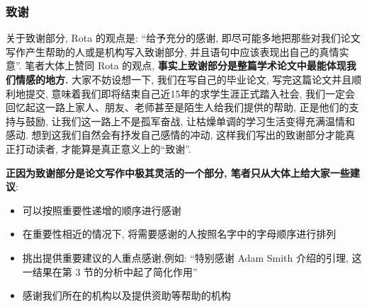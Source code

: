 \documentclass{formatBook}
\begin{document}
\subsubsection{致谢}
关于致谢部分, Rota 的观点是: ``给予充分的感谢, 即尽可能多地把那些对我们论文写作产生帮助的人或是机构写入致谢部分, 并且语句中应该表现出自己的真情实意''\cite{RotaTen1997}. 笔者大体上赞同 Rota 的观点, \textbf{事实上致谢部分是整篇学术论文中最能体现我们情感的地方. }大家不妨设想一下, 我们在写自己的毕业论文, 写完这篇论文并且顺利地提交, 意味着我们即将结束自己近15年的求学生涯正式踏入社会, 我们一定会回忆起这一路上家人、朋友、老师甚至是陌生人给我们提供的帮助, 正是他们的支持与鼓励, 让我们这一路上不是孤军奋战, 让枯燥单调的学习生活变得充满温情和感动. 想到这我们自然会有抒发自己感情的冲动, 这样我们写出的致谢部分才能真正打动读者, 才能算是真正意义上的``致谢”. 
\par \textbf{正因为致谢部分是论文写作中极其灵活的一个部分, 笔者只从大体上给大家一些建议}: 
\begin{itemize}
    \item 可以按照重要性递增的顺序进行感谢
    \item 在重要性相近的情况下, 将需要感谢的人按照名字中的字母顺序进行排列
    \item 挑出提供重要建议的人重点感谢,例如: ``特别感谢 Adam Smith 介绍的引理, 这一结果在第 3 节的分析中起了简化作用”
    \item 感谢我们所在的机构以及提供资助等帮助的机构
\end{itemize}
\end{document}
